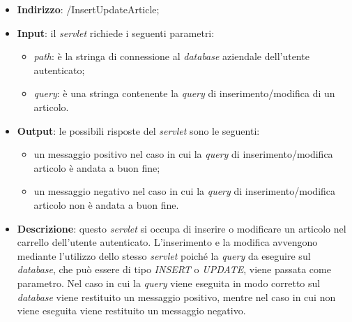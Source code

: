\begin{itemize}
	\item \textbf{Indirizzo}: /InsertUpdateArticle;
	\item \textbf{Input}: il \textit{servlet} richiede i seguenti parametri:
		\begin{itemize}
			\item \textit{path}: è la stringa di connessione al \textit{database} aziendale dell'utente autenticato;
			\item \textit{query}: è una stringa contenente la \textit{query} di inserimento/modifica di un articolo.
		\end{itemize}
	\item \textbf{Output}: le possibili risposte del \textit{servlet} sono le seguenti:
		\begin{itemize}
			\item un messaggio positivo nel caso in cui la \textit{query} di inserimento/modifica articolo è andata a buon fine;
			\item un messaggio negativo nel caso in cui la \textit{query} di inserimento/modifica articolo non è andata a buon fine.
		\end{itemize}
	\item \textbf{Descrizione}: questo \textit{servlet} si occupa di inserire o modificare un articolo nel carrello dell'utente autenticato. L'inserimento e la modifica avvengono mediante l'utilizzo dello stesso \textit{servlet} poiché la \textit{query} da eseguire sul \textit{database}, che può essere di tipo \textit{INSERT} o \textit{UPDATE}, viene passata come parametro. Nel caso in cui la \textit{query} viene eseguita in modo corretto sul \textit{database} viene restituito un messaggio positivo, mentre nel caso in cui non viene eseguita viene restituito un messaggio negativo.
\end{itemize}


